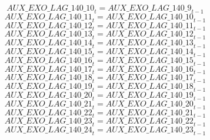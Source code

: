 \begin{dmath}
{AUX\_EXO\_LAG\_140\_10}_{t}={AUX\_EXO\_LAG\_140\_9}_{t-1}
\end{dmath}
\begin{dmath}
{AUX\_EXO\_LAG\_140\_11}_{t}={AUX\_EXO\_LAG\_140\_10}_{t-1}
\end{dmath}
\begin{dmath}
{AUX\_EXO\_LAG\_140\_12}_{t}={AUX\_EXO\_LAG\_140\_11}_{t-1}
\end{dmath}
\begin{dmath}
{AUX\_EXO\_LAG\_140\_13}_{t}={AUX\_EXO\_LAG\_140\_12}_{t-1}
\end{dmath}
\begin{dmath}
{AUX\_EXO\_LAG\_140\_14}_{t}={AUX\_EXO\_LAG\_140\_13}_{t-1}
\end{dmath}
\begin{dmath}
{AUX\_EXO\_LAG\_140\_15}_{t}={AUX\_EXO\_LAG\_140\_14}_{t-1}
\end{dmath}
\begin{dmath}
{AUX\_EXO\_LAG\_140\_16}_{t}={AUX\_EXO\_LAG\_140\_15}_{t-1}
\end{dmath}
\begin{dmath}
{AUX\_EXO\_LAG\_140\_17}_{t}={AUX\_EXO\_LAG\_140\_16}_{t-1}
\end{dmath}
\begin{dmath}
{AUX\_EXO\_LAG\_140\_18}_{t}={AUX\_EXO\_LAG\_140\_17}_{t-1}
\end{dmath}
\begin{dmath}
{AUX\_EXO\_LAG\_140\_19}_{t}={AUX\_EXO\_LAG\_140\_18}_{t-1}
\end{dmath}
\begin{dmath}
{AUX\_EXO\_LAG\_140\_20}_{t}={AUX\_EXO\_LAG\_140\_19}_{t-1}
\end{dmath}
\begin{dmath}
{AUX\_EXO\_LAG\_140\_21}_{t}={AUX\_EXO\_LAG\_140\_20}_{t-1}
\end{dmath}
\begin{dmath}
{AUX\_EXO\_LAG\_140\_22}_{t}={AUX\_EXO\_LAG\_140\_21}_{t-1}
\end{dmath}
\begin{dmath}
{AUX\_EXO\_LAG\_140\_23}_{t}={AUX\_EXO\_LAG\_140\_22}_{t-1}
\end{dmath}
\begin{dmath}
{AUX\_EXO\_LAG\_140\_24}_{t}={AUX\_EXO\_LAG\_140\_23}_{t-1}
\end{dmath}
